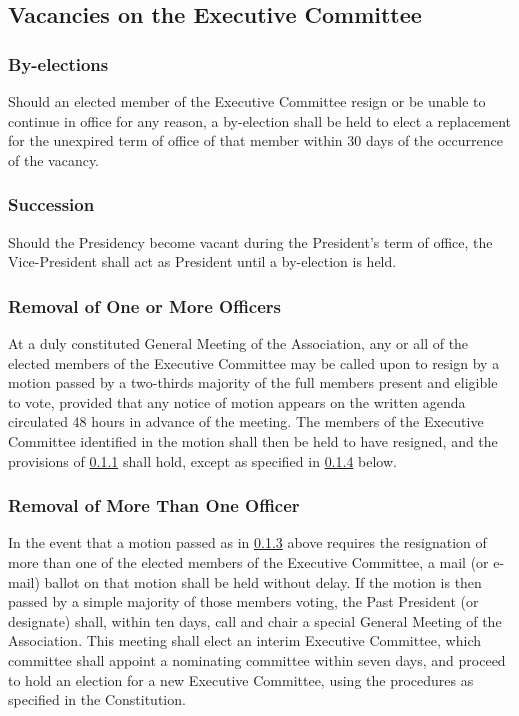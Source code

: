 \documentclass[12pt]{article}
\begin{document}
\subsection{Vacancies on the Executive Committee}

\subsubsection{By-elections}
\label{by-elections}
Should an elected member of the Executive Committee resign or be unable to continue in office for any reason, a by-election shall be held to elect a replacement for the unexpired term of office of that member within 30 days of the occurrence of the vacancy.

\subsubsection{Succession}
Should the Presidency become vacant during the President's term of office, the Vice-President shall act as President until a by-election is held.

\subsubsection{Removal of One or More Officers}
\label{remove-one}
At a duly constituted General Meeting of the Association, any or all of the elected members of the Executive Committee may be called upon to resign by a motion passed by a two-thirds majority of the full members present and eligible to vote, provided that any notice of motion appears on the written agenda circulated 48 hours in advance of the meeting. The members of the Executive Committee identified in the motion shall then be held to have resigned, and the provisions of \ref{by-elections} shall hold, except as specified in \ref{remove-more} below.

\subsubsection{Removal of More Than One Officer}
\label{remove-more}

In the event that a motion passed as in \ref{remove-one} above requires the resignation of more than one of the elected members of the Executive Committee, a mail (or e-mail) ballot on that motion shall be held without delay. If the motion is then passed by a simple majority of those members voting, the Past President (or designate) shall, within ten days, call and chair a special General Meeting of the Association. This meeting shall elect an interim Executive Committee, which committee shall appoint a nominating committee within seven days, and proceed to hold an election for a new Executive Committee, using the procedures as specified in the Constitution.
\end{document}
